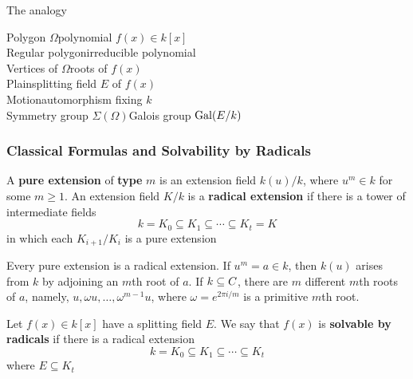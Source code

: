 \documentclass[11pt]{article}
\begin{document}
The analogy
\begin{center}
Polygon \(\Omega\)\dotfill polynomial \(f(x)\in k[x]\)\\
Regular polygon\dotfill irreducible polynomial\\
Vertices of \(\Omega\)\dotfill roots of \(f(x)\)\\
Plain\dotfill splitting field $E$ of \(f(x)\)\\
Motion\dotfill automorphism fixing $k$\\
Symmetry group \(\Sigma(\Omega)\)\dotfill Galois group \(\operatorname{Gal}(E/k)\)
\end{center}
\subsubsection{Classical Formulas and Solvability by Radicals}
\label{sec:orgb8d132d}
\begin{definition}[]
A \textbf{pure extension} of \textbf{type} \(m\) is an extension field \(k(u)/k\), where
\(u^m\in k\) for some \(m\ge1\). An extension field \(K/k\) is a \textbf{radical
extension} if there is a tower of intermediate fields
\begin{equation*}
k=K_0\subseteq K_1\subseteq\cdots\subseteq K_t=K
\end{equation*}
in which each \(K_{i+1}/K_i\) is a pure extension
\end{definition}

Every pure extension is a radical extension. If \(u^m=a\in k\), then
\(k(u)\) arises from \(k\) by adjoining an \(m\)th root of \(a\). If
\(k\subseteq\relax{C}\), there are \(m\) different \(m\)th roots of \(a\), namely,
\(u,\omega u,\dots,\omega^{m-1}u\), where \(\omega=e^{2\pi i/m}\) is a primitive
\(m\)th root.

\begin{definition}[]
Let \(f(x)\in k[x]\) have a splitting field \(E\). We say that \(f(x)\) is
\textbf{solvable by radicals} if there is a radical extension
\begin{equation*}
k=K_0\subseteq K_1\subseteq\cdots\subseteq K_t
\end{equation*}
where \(E\subseteq K_t\)
\end{definition}
\end{document}
